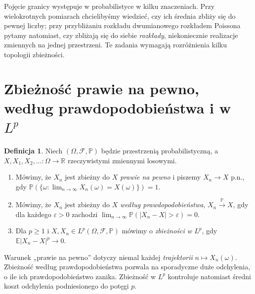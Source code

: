 \documentclass[11pt,a4paper,oneside]{report}
\numberwithin{equation}{chapter}
\theoremstyle{plain}
\theoremstyle{definition}
\newtheorem{definicja}{Definicja}[chapter]
\theoremstyle{remark}
\newcommand{\R}{\mathbb{R}}
\newcommand{\Prob}{\mathbb{P}}
\newcommand{\E}{\mathbb{E}}
\begin{document}
Pojęcie granicy występuje w probabilistyce w kilku znaczeniach.
Przy wielokrotnych pomiarach chcielibyśmy wiedzieć, czy
ich średnia zbliży się do pewnej liczby; przy przybliżaniu
rozkładu dwumianowego rozkładem Poissona pytamy natomiast,
czy zbliżają się do siebie \emph{rozkłady}, niekoniecznie
realizacje zmiennych na jednej przestrzeni. Te zadania
wymagają rozróżnienia kilku topologii zbieżności.

\section{Zbieżność prawie na pewno, według prawdopodobieństwa i w~\texorpdfstring{$L^p$}{Lp}}

\begin{definicja}
Niech $(\Omega,\mathcal F,\Prob)$ będzie przestrzenią
probabilistyczną, a $X,X_1,X_2,\ldots:\Omega\to\R$
rzeczywistymi zmiennymi losowymi.
\begin{enumerate}
\item Mówimy, że $X_n$ jest zbieżny do $X$ \emph{prawie na pewno}
 i piszemy $X_n\to X$ p.n., gdy
 $\Prob(\{\omega:\lim_{n\to\infty}X_n(\omega)=X(\omega)\})=1$.
\item Mówimy, że $X_n$ jest zbieżny do $X$
 \emph{według prawdopodobieństwa}, $X_n\xrightarrow{\Prob}X$,
 gdy dla każdego $\varepsilon>0$ zachodzi
 $\lim_{n\to\infty}\Prob(|X_n-X|>\varepsilon)=0$.
\item Dla $p\geq1$ i $X,X_n\in L^p(\Omega,\mathcal F,\Prob)$
 mówimy o \emph{zbieżności w $L^p$}, gdy
 $\E|X_n-X|^p\to0$.
\end{enumerate}
\end{definicja}

Warunek „prawie na pewno” dotyczy niemal każdej
\emph{trajektorii} $n\mapsto X_n(\omega)$.
Zbieżność według prawdopodobieństwa pozwala na sporadyczne
duże odchylenia, o ile ich prawdopodobieństwo zanika.
Zbieżność w $L^p$ kontroluje natomiast średni koszt
odchylenia podniesionego do potęgi $p$.
\end{document}
